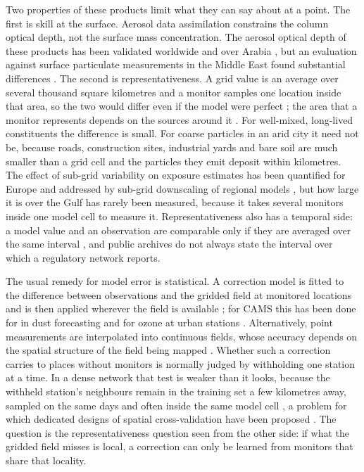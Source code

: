 Two properties of these products limit what they can say about \pmten{} at a point. The first is
skill at the surface. Aerosol data assimilation constrains the column optical depth, not the
surface mass concentration. The aerosol optical depth of these products has been validated
worldwide and over Arabia \citep{eskes2015,gueymard2020,labban2023}, but an evaluation against
surface particulate measurements in the Middle East found substantial differences \citep{ukhov2020}. The second is
representativeness. A grid value is an average over several thousand square kilometres and a
monitor samples one location inside that area, so the two would differ even if the model were
perfect \citep{schutgens2016,schutgens2017,janjic2018}; the area that a monitor represents
depends on the sources around it \citep{janssen2012,righini2014,duyzer2015}. For well-mixed,
long-lived constituents
the difference is small. For coarse particles in an arid city it need not be, because roads,
construction sites, industrial yards and bare soil are much smaller than a grid cell and the
particles they emit deposit within kilometres. The effect of sub-grid variability on exposure
estimates has been quantified for Europe \citep{denby2011,denby2024} and addressed by sub-grid
downscaling of regional models \citep{theobald2016}, but how large it is over the Gulf has rarely
been measured, because it takes several monitors inside one model cell to measure it. Representativeness also has a temporal side: a model value and an observation are comparable
only if they are averaged over the same interval \citep{schutgens2017}, and public archives do not
always state the interval over which a regulatory network reports.

The usual remedy for model error is statistical. A correction model is fitted to the difference
between observations and the gridded field at monitored locations and is then applied wherever
the field is available \citep{djalalova2015,huang2017}; for CAMS this has been done for
\pmten{} in dust forecasting \citep{sarafian2025} and for ozone at urban stations
\citep{kaffashzadeh2024}. Alternatively, point measurements are interpolated into continuous
fields, whose accuracy depends on the spatial structure of the field being mapped
\citep{kang2026mapping}. Whether such a correction
carries to places without monitors is normally judged by withholding one station at a time. In a
dense network that test is weaker than it looks, because the withheld station's neighbours remain
in the training set a few kilometres away, sampled on the same days and often inside the same
model cell \citep{roberts2017,ploton2020,meyer2021aoa,wadoux2021}, a problem for which
dedicated designs of spatial cross-validation have been proposed
\citep{valavi2019,mila2022,linnenbrink2024,meyer2022global}. The question is the
representativeness question seen from the other side: if what the gridded field misses is local,
a correction can only be learned from monitors that share that locality.

